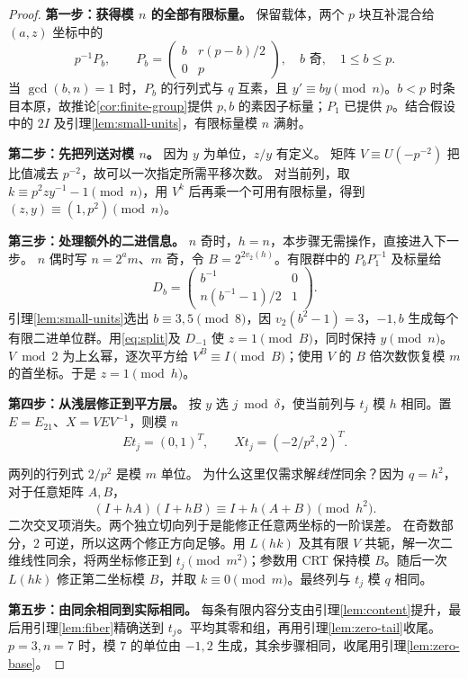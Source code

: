 \documentclass[11pt,a4paper,oneside,openany]{book}
\theoremstyle{definition}
\numberwithin{equation}{chapter}
\begin{document}
\begin{proof}

\par\noindent\textbf{第一步：获得模 $n$ 的全部有限标量。}
保留载体，两个 $p$ 块互补混合给 $(a,z)$ 坐标中的
\[
p^{-1}P_b,\qquad P_b=\begin{pmatrix}b&r(p-b)/2\\0&p\end{pmatrix},
\quad b\text{ 奇},\quad1\le b\le p.
\]
当 $\gcd(b,n)=1$ 时，$P_b$ 的行列式与 $q$ 互素，且 $y'\equiv by\pmod n$。$b<p$ 时条目本原，故推论\ref{cor:finite-group}提供 $p,b$ 的素因子标量；$P_1$ 已提供 $p$。结合假设中的 $2I$ 及引理\ref{lem:small-units}，有限标量模 $n$ 满射。

\par\noindent\textbf{第二步：先把列送对模 $n$。}
因为 $y$ 为单位，$z/y$ 有定义。
矩阵 $V\equiv U(-p^{-2})$ 把比值减去 $p^{-2}$，故可以一次指定所需平移次数。
对当前列，取 $k\equiv p^2zy^{-1}-1\pmod n$，用 $V^k$ 后再乘一个可用有限标量，得到 $(z,y)\equiv(1,p^2)\pmod n$。


\par\noindent\textbf{第三步：处理额外的二进信息。}
$n$ 奇时，$h=n$，本步骤无需操作，直接进入下一步。
$n$ 偶时写 $n=2^a m$、$m$ 奇，令 $B=2^{2v_2(h)}$。有限群中的 $P_bP_1^{-1}$ 及标量给
\begin{equation}\label{eq:split}
D_b=\begin{pmatrix}b^{-1}&0\\n(b^{-1}-1)/2&1\end{pmatrix}.
\end{equation}
引理\ref{lem:small-units}选出 $b\equiv3,5\pmod8$，因 $v_2(b^2-1)=3$，$-1,b$ 生成每个有限二进单位群。用\eqref{eq:split}及 $D_{-1}$ 使 $z=1\pmod B$，同时保持 $y\pmod n$。$V\bmod2$ 为上幺幂，逐次平方给 $V^B\equiv I\pmod B$；使用 $V$ 的 $B$ 倍次数恢复模 $m$ 的首坐标。于是 $z=1\pmod h$。

\par\noindent\textbf{第四步：从浅层修正到平方层。}
按 $y$ 选 $j\bmod\delta$，使当前列与 $t_j$ 模 $h$ 相同。置 $E=E_{21}$、$X=VEV^{-1}$，则模 $n$
\[
Et_j=(0,1)^T,\qquad Xt_j=(-2/p^2,2)^T.
\]

两列的行列式 $2/p^2$ 是模 $m$ 单位。
为什么这里仅需求解\emph{线性}同余？因为 $q=h^2$，对于任意矩阵 $A,B$，
\[
(I+hA)(I+hB)\equiv I+h(A+B)\pmod{h^2}.
\]
二次交叉项消失。两个独立切向列于是能修正任意两坐标的一阶误差。
在奇数部分，$2$ 可逆，所以这两个修正方向足够。用 $L(hk)$ 及其有限 $V$ 共轭，解一次二维线性同余，将两坐标修正到 $t_j\pmod{m^2}$；参数用 CRT 保持模 $B$。随后一次 $L(hk)$ 修正第二坐标模 $B$，并取 $k\equiv0\pmod m$。最终列与 $t_j$ 模 $q$ 相同。

\par\noindent\textbf{第五步：由同余相同到实际相同。}
每条有限内容分支由引理\ref{lem:content}提升，最后用引理\ref{lem:fiber}精确送到 $t_j$。平均其零和组，再用引理\ref{lem:zero-tail}收尾。$p=3,n=7$ 时，模 $7$ 的单位由 $-1,2$ 生成，其余步骤相同，收尾用引理\ref{lem:zero-base}。
\end{proof}
\end{document}

